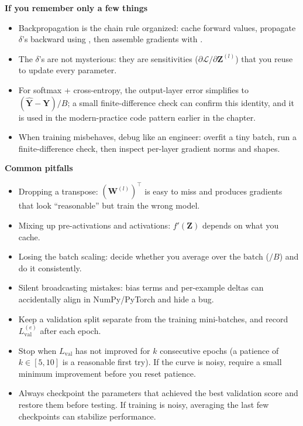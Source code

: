 \begin{tcolorbox}[summarybox, title={Key takeaways}]
\textbf{If you remember only a few things}
\begin{itemize}
    \item Backpropagation is the chain rule organized: cache forward values, propagate \(\delta\)'s backward using , then assemble gradients with .
    \item The \(\delta\)'s are not mysterious: they are sensitivities (\(\partial \mathcal{L}/\partial \mathbf{Z}^{(l)}\)) that you reuse to update every parameter.
    \item For softmax + cross\hyp{}entropy, the output-layer error simplifies to \((\hat{\mathbf{Y}}-\mathbf{Y})/B\); a small finite-difference check can confirm this identity, and it is used in the modern-practice code pattern earlier in the chapter.
    \item When training misbehaves, debug like an engineer: overfit a tiny batch, run a finite-difference check, then inspect per-layer gradient norms and shapes.
\end{itemize}
    \medskip
    \textbf{Common pitfalls}
    \begin{itemize}
        \item Dropping a transpose: \((\mathbf{W}^{(l)})^\top\) is easy to miss and produces gradients that look ``reasonable'' but train the wrong model.
        \item Mixing up pre\hyp{}activations and activations: \(f'(\mathbf{Z})\) depends on what you cache.
        \item Losing the batch scaling: decide whether you average over the batch (\(/B\)) and do it consistently.
        \item Silent broadcasting mistakes: bias terms and per-example deltas can accidentally align in NumPy/PyTorch and hide a bug.
    \end{itemize}
    \end{tcolorbox}

    \begin{tcolorbox}[summarybox, title={Practical early stopping and checkpointing}]
    \begin{itemize}
        \item Keep a validation split separate from the training mini\hyp{}batches, and record \(L_{\text{val}}^{(e)}\) after each epoch.
        \item Stop when \(L_{\text{val}}\) has not improved for \(k\) consecutive epochs (a patience of \(k\in[5,10]\) is a reasonable first try). If the curve is noisy, require a small minimum improvement before you reset patience.
        \item Always checkpoint the parameters that achieved the best validation score and restore them before testing. If training is noisy, averaging the last few checkpoints can stabilize performance.
\end{itemize}
\end{tcolorbox}

